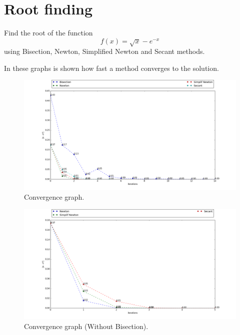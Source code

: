 \documentclass{article}
\begin{document}
	\section{Root finding}
		\begin{center}
			\par Find the root of the function
			\[
				f(x) = \sqrt{x} - e^{-x}
			\]
			using Bisection, Newton, Simplified Newton and Secant methods.
			\hr
		\end{center}

		In these graphs is shown how fast a method converges to the solution.
		\begin{center} \begin{figure}[!ht]
			\begin{mdframed} \begin{center}
				\includegraphics[scale=0.37]{./imgs/Ex1Plot.png}
				\caption{Convergence graph.}
			\end{center} \end{mdframed}
			\label{fig:graph1}
		\end{figure} \end{center}

		\begin{center} \begin{figure}[!ht]
			\begin{mdframed} \begin{center}
				\includegraphics[scale=0.38]{./imgs/Ex1Plot2.png}
				\caption{Convergence graph (Without Bisection).}
			\end{center} \end{mdframed}
			\label{fig:graph2}
		\end{figure} \end{center}
\end{document}
